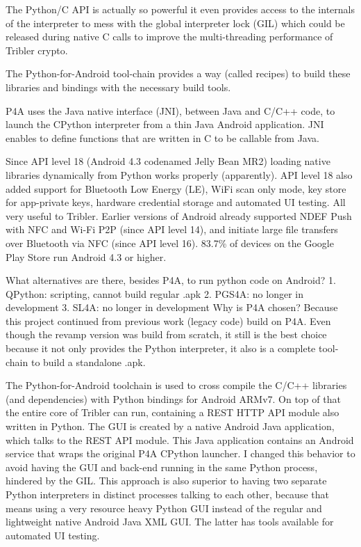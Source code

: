 The Python/C API is actually so powerful it even provides access to the internals of the interpreter to mess with the global interpreter lock (GIL) which could be released during native C calls to improve the multi-threading performance of Tribler crypto.

The Python-for-Android tool-chain provides a way (called recipes) to build these libraries and bindings with the necessary build tools.

P4A uses the Java native interface (JNI), between Java and C/C++ code, to launch the CPython interpreter from a thin Java Android application.
JNI enables to define functions that are written in C to be callable from Java.


Since API level 18 (Android 4.3 codenamed Jelly Bean MR2) loading native libraries dynamically from Python works properly (apparently).
API level 18 also added support for Bluetooth Low Energy (LE), WiFi scan only mode, key store for app-private keys, hardware credential storage and automated UI testing.
All very useful to Tribler.
Earlier versions of Android already supported NDEF Push with NFC and Wi-Fi P2P (since API level 14), and initiate large file transfers over Bluetooth via NFC (since API level 16).
83.7\% of devices on the Google Play Store run Android 4.3 or higher.


What alternatives are there, besides P4A, to run python code on Android?
1. QPython: scripting, cannot build regular .apk
2. PGS4A: no longer in development
3. SL4A: no longer in development
Why is P4A chosen?
Because this project continued from previous work (legacy code) build on P4A.
Even though the revamp version was build from scratch, it still is the best choice because it not only provides the Python interpreter, it also is a complete tool-chain to build a standalone .apk.

The Python-for-Android toolchain is used to cross compile the C/C++ libraries (and dependencies) with Python bindings for Android ARMv7.
On top of that the entire core of Tribler can run, containing a REST HTTP API module also written in Python.
The GUI is created by a native Android Java application, which talks to the REST API module.
This Java application contains an Android service that wraps the original P4A CPython launcher.
I changed this behavior to avoid having the GUI and back-end running in the same Python process, hindered by the GIL.
This approach is also superior to having two separate Python interpreters in distinct processes talking to each other, because that means using a very resource heavy Python GUI instead of the regular and lightweight native Android Java XML GUI.
The latter has tools available for automated UI testing.

